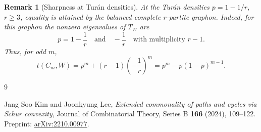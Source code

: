 \documentclass[11pt]{article}
\newtheorem{remark}{Remark}
\begin{document}
\begin{remark}[Sharpness at Tur\'an densities]
At the Tur\'an densities $p=1-1/r$, $r\ge 3$, equality is attained by the
balanced complete $r$-partite graphon.  Indeed, for this graphon the
nonzero eigenvalues of $T_W$ are
\[
    p=1-\frac1r
    \quad\text{and}\quad
    -\frac1r
    \quad\text{with multiplicity }r-1.
\]
Thus, for odd $m$,
\[
    t(C_m,W)
    =p^m+(r-1)\left(-\frac1r\right)^m
    =p^m-p(1-p)^{m-1}.
\]
\end{remark}

\begin{thebibliography}{9}

Jang Soo Kim and Joonkyung Lee,
\emph{Extended commonality of paths and cycles via Schur convexity},
Journal of Combinatorial Theory, Series B \textbf{166} (2024), 109--122.
Preprint: \href{https://arxiv.org/abs/2210.00977}{arXiv:2210.00977}.

\end{thebibliography}
\end{document}
